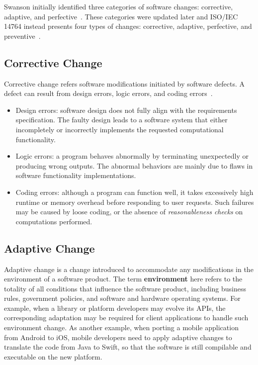 Swanson initially identified three categories of software changes: corrective, adaptive, and perfective~\cite{Swanson1976:Dimension}. These categories were updated later and ISO/IEC 14764 instead presents four types of changes: corrective, adaptive, perfective, and preventive~\cite{iso}.

\subsection{Corrective Change} 
Corrective change refers software modifications initiated by software defects. A defect can result from design errors, logic errors, and coding errors~\cite{Longstreet1990:smc}.

\begin{itemize}
\item Design errors: software design does not fully align with the requirements specification. The faulty design leads to a software system that either incompletely or incorrectly implements the requested computational functionality. 
\item Logic errors: a program behaves abnormally by terminating unexpectedly or producing wrong outputs. The abnormal behaviors are mainly due to flaws in software functionality implementations.
\item Coding errors: although a program can function well, it takes excessively high runtime or memory overhead before responding to user requests. Such failures may be caused by loose coding, or the absence of {\em reasonableness checks} on computations performed.
\end{itemize}

\subsection{Adaptive Change}
Adaptive change is a change introduced to accommodate any modifications in the environment of a software product. The term \textbf{environment} here refers to the totality of all conditions that influence the software product, including business rules, government policies, and software and hardware operating systems. For example, when a library or platform developers may evolve its APIs, the corresponding adaptation may be required for client applications to handle such environment change. As another example, when porting a mobile application from Android to iOS, mobile developers need to apply adaptive changes to translate the code from Java to Swift, so that the software is still compilable and executable on the new platform.  
